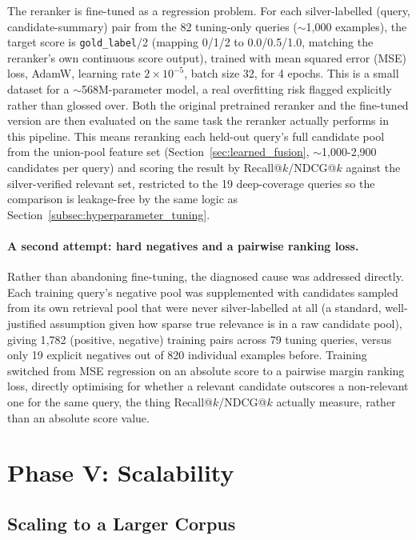 \documentclass[a4paper,oneside,bibliography=totoc]{scrbook}
\begin{document}
The reranker is fine-tuned as a regression problem. For each silver-labelled (query, candidate-summary) pair from the 82 tuning-only queries ($\sim$1{,}000 examples), the target score is \texttt{gold\_label}/2 (mapping 0/1/2 to 0.0/0.5/1.0, matching the reranker's own continuous score output), trained with mean squared error (MSE) loss, AdamW, learning rate $2\times10^{-5}$, batch size 32, for 4 epochs. This is a small dataset for a $\sim$568M-parameter model, a real overfitting risk flagged explicitly rather than glossed over. Both the original pretrained reranker and the fine-tuned version are then evaluated on the same task the reranker actually performs in this pipeline. This means reranking each held-out query's full candidate pool from the union-pool feature set (Section~\ref{sec:learned_fusion}, $\sim$1{,}000-2{,}900 candidates per query) and scoring the result by Recall@$k$/NDCG@$k$ against the silver-verified relevant set, restricted to the 19 deep-coverage queries so the comparison is leakage-free by the same logic as Section~\ref{subsec:hyperparameter_tuning}.

\paragraph{A second attempt: hard negatives and a pairwise ranking loss.} Rather than abandoning fine-tuning, the diagnosed cause was addressed directly. Each training query's negative pool was supplemented with candidates sampled from its own retrieval pool that were never silver-labelled at all (a standard, well-justified assumption given how sparse true relevance is in a raw candidate pool), giving 1{,}782 (positive, negative) training pairs across 79 tuning queries, versus only 19 explicit negatives out of 820 individual examples before. Training switched from MSE regression on an absolute score to a pairwise margin ranking loss, directly optimising for whether a relevant candidate outscores a non-relevant one for the same query, the thing Recall@$k$/NDCG@$k$ actually measure, rather than an absolute score value.

\section{Phase V: Scalability}
\label{sec:phase5_method}

\subsection{Scaling to a Larger Corpus}
\label{sec:scaling_corpus}
\end{document}
